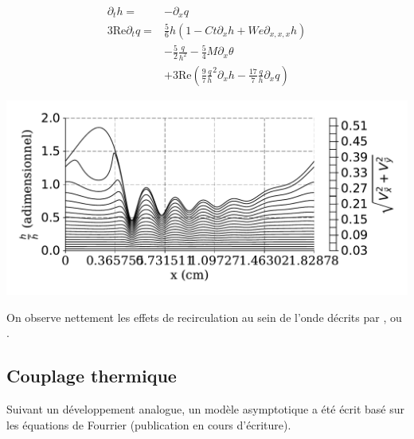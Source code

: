 \documentclass[a0,portrait,11pt]{a0poster}
\begin{document}
\begin{multicols}{2}
\begin{multicols}{2}
    \begin{align*}
        \partial_t h =& -\partial_x q\\
        3 \mathrm{Re} \partial_t q =& \frac{5}{6} h
            \left(
                1 - Ct \partial_x h + We \partial_{x,x,x} h
            \right)\\
        & - \frac{5}{2}\frac{q}{h^2}
        - \frac{5}{4} M \partial_x \theta \\
        & + 3 \mathrm{Re}
            \left(
                \frac{9}{7}\frac{q}{h}^2 \partial_x h - \frac{17}{7}\frac{q}{h} \partial_x q
            \right)
    \end{align*}
    \columnbreak
    \begin{center}\vspace{.5cm}
        \includegraphics[width=0.95\columnwidth]{01-established_wave_streamlines}
        \label{fig:streamlines}
    \end{center}\vspace{.5cm}
\end{multicols}

On observe nettement les effets de recirculation au sein de l'onde décrits par \textcite{Brauner1989}, \textcite{Yoshimura1996} ou \textcite{Miyara1999}.

\subsection*{Couplage thermique}
Suivant un développement analogue, un modèle asymptotique a été écrit basé sur les équations de Fourrier (publication en cours d'écriture).


\end{multicols}
\end{document}
